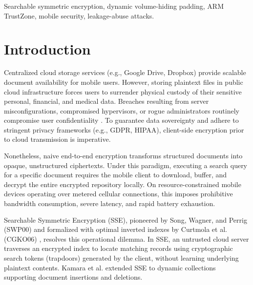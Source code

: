 \documentclass[10pt,conference]{IEEEtran}
\begin{document}
\begin{IEEEkeywords}
Searchable symmetric encryption, dynamic volume-hiding padding, ARM TrustZone, mobile security, leakage-abuse attacks.
\end{IEEEkeywords}

\section{Introduction}
Centralized cloud storage services (e.g., Google Drive, Dropbox) provide scalable document availability for mobile users. However, storing plaintext files in public cloud infrastructure forces users to surrender physical custody of their sensitive personal, financial, and medical data. Breaches resulting from server misconfigurations, compromised hypervisors, or rogue administrators routinely compromise user confidentiality \cite{islam2012,cash2015leakage}. To guarantee data sovereignty and adhere to stringent privacy frameworks (e.g., GDPR, HIPAA), client-side encryption prior to cloud transmission is imperative.

Nonetheless, naive end-to-end encryption transforms structured documents into opaque, unstructured ciphertexts. Under this paradigm, executing a search query for a specific document requires the mobile client to download, buffer, and decrypt the entire encrypted repository locally. On resource-constrained mobile devices operating over metered cellular connections, this imposes prohibitive bandwidth consumption, severe latency, and rapid battery exhaustion.

Searchable Symmetric Encryption (SSE), pioneered by Song, Wagner, and Perrig (SWP00) \cite{song2000} and formalized with optimal inverted indexes by Curtmola et al. (CGKO06) \cite{curtmola2006}, resolves this operational dilemma. In SSE, an untrusted cloud server traverses an encrypted index to locate matching records using cryptographic search tokens (trapdoors) generated by the client, without learning underlying plaintext contents. Kamara et al. \cite{kamara2012} extended SSE to dynamic collections supporting document insertions and deletions.
\end{document}
